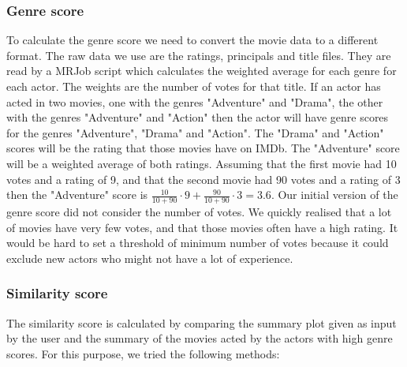 \subsubsection{Genre score}
To calculate the genre score we need to convert the movie data to a different format. The raw data we use are the ratings, principals and title files. They are read by a MRJob script which calculates the weighted average for each genre for each actor. The weights are the number of votes for that title. If an actor has acted in two movies, one with the genres "Adventure" and "Drama", the other with the genres "Adventure" and "Action" then the actor will have genre scores for the genres "Adventure", "Drama" and "Action". The "Drama" and "Action" scores will be the rating that those movies have on IMDb. The "Adventure" score will be a weighted average of both ratings. Assuming that the first movie had 10 votes and a rating of 9, and that the second movie had 90 votes and a rating of 3 then the "Adventure" score is $\frac{10}{10+90}\cdot9+\frac{90}{10+90}\cdot3=3.6$. Our initial version of the genre score did not consider the number of votes. We quickly realised that a lot of movies have very few votes, and that those movies often have a high rating. It would be hard to set a threshold of minimum number of votes because it could exclude new actors who might not have a lot of experience. 

\subsubsection{Similarity score}
The similarity score is calculated by comparing the summary plot given as input by the user and the summary of the movies acted by the actors with high genre scores. For this purpose, we tried the following methods: 

